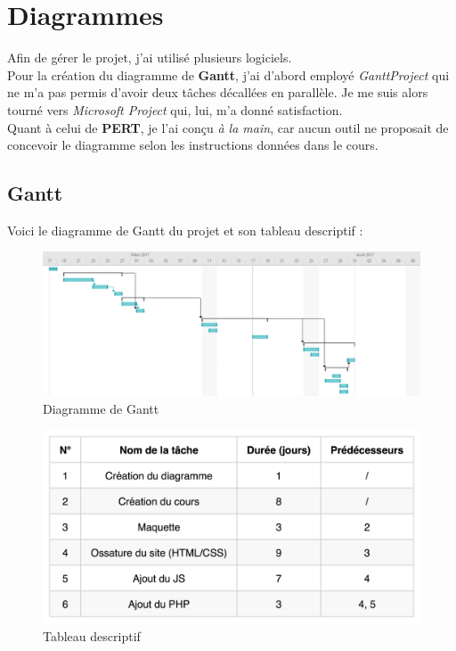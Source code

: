 \section{Diagrammes}
\label{sec:diagrammes}

Afin de gérer le projet, j'ai utilisé plusieurs logiciels. \\

Pour la création du diagramme de \textbf{Gantt}, j'ai d'abord employé \textit{GanttProject} qui ne m'a pas permis d'avoir deux tâches décallées en parallèle. Je me suis alors tourné vers \textit{Microsoft Project} qui, lui, m'a donné satisfaction. \\

Quant à celui de \textbf{PERT}, je l'ai conçu \textit{à la main}, car aucun outil ne proposait de concevoir le diagramme selon les instructions données dans le cours.

\newpage


\subsection{Gantt}
\label{subsec:gantt}

Voici le diagramme de Gantt du projet et son tableau descriptif :


\begin{figure}[!h]
    \centering
    \includegraphics[scale=0.5]{textures/images/diagrammes/DiagrammeDeGantt.pdf}
    \caption{Diagramme de Gantt}
\end{figure}
\begin{figure}[!h]
    \centering
    \includegraphics[scale=0.3]{textures/images/diagrammes/TableauDeGantt_brief.pdf}
    \caption{Tableau descriptif}
\end{figure}

